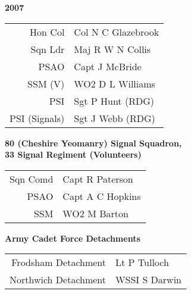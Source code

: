 \begin{center}
  \Huge
  \textbf{2007}
\end{center}

\begin{center}
  \small
  \begin{tabular}{rl}
    Hon Col & Col N C Glazebrook \\
    Sqn Ldr & Maj R W N Collis \\
    PSAO & Capt J McBride \\
    SSM (V) & WO2 D L Williams \\
    PSI & Sgt P Hunt (RDG) \\
    PSI (Signals) & Sgt J Webb (RDG) \\
  \end{tabular}
\end{center}

\begin{center}
  \Large
  \textbf{80 (Cheshire Yeomanry) Signal Squadron, \\ 33 Signal Regiment (Volunteers)}
\end{center}

\begin{center}
  \small
  \begin{tabular}{rl}
    Sqn Comd & Capt R Paterson \\
    PSAO & Capt A C Hopkins \\
    SSM & WO2 M Barton \\
  \end{tabular}
\end{center}

\begin{center}
  \Large
  \textbf{Army Cadet Force Detachments}
\end{center}

\begin{center}
  \small
  \begin{tabular}{rl}
    Frodsham Detachment & Lt P Tulloch \\
    Northwich Detachment & WSSI S Darwin \\
  \end{tabular}
\end{center}

\vspace{50mm}

\pagebreak
